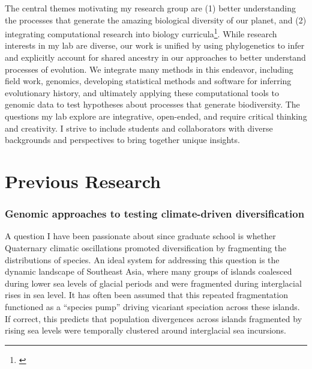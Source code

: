 \noindent
The central themes motivating my research group are
(1) better understanding the processes that generate the amazing biological
diversity of our planet,
and
(2) integrating computational research into biology
curricula\footnote{\label{Wright19}\hspace{-0.8em}}.
While research interests in my lab are diverse, our work is unified by
using
phylogenetics to infer and explicitly account for shared ancestry in our
approaches to better understand processes of evolution.
We integrate many methods in this endeavor, including
field work,
genomics,
developing statistical methods and software for inferring
evolutionary history, and ultimately applying these computational tools to
genomic data to test
hypotheses about processes that generate biodiversity.
The questions my lab explore are integrative, open-ended, and require critical
thinking and creativity.
I strive to include students and collaborators with diverse backgrounds and
perspectives to bring together unique insights.

\section*{Previous Research}
\subsubsection*{Genomic approaches to testing climate-driven diversification}
A question I have been passionate about since graduate school is whether
Quaternary climatic oscillations promoted diversification by fragmenting the
distributions of species.
An ideal system for addressing this question is the dynamic landscape of
Southeast Asia, where many groups of islands coalesced during lower sea levels
of glacial periods and were fragmented during interglacial rises in sea level.
It has often been assumed that this repeated fragmentation functioned as a
``species pump'' driving vicariant speciation across these islands.
If correct, this predicts that population divergences across islands fragmented
by rising sea levels were temporally clustered around interglacial sea
incursions.

